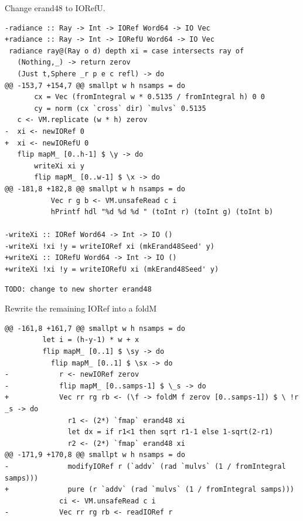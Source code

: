 \documentclass[8pt]{beamer}
\begin{document}
\begin{frame}[fragile]{Change erand48 to IORefU.}

\begin{verbatim}
-radiance :: Ray -> Int -> IORef Word64 -> IO Vec
+radiance :: Ray -> Int -> IORefU Word64 -> IO Vec
 radiance ray@(Ray o d) depth xi = case intersects ray of
   (Nothing,_) -> return zerov
   (Just t,Sphere _r p e c refl) -> do
@@ -153,7 +154,7 @@ smallpt w h nsamps = do
       cx = Vec (fromIntegral w * 0.5135 / fromIntegral h) 0 0
       cy = norm (cx `cross` dir) `mulvs` 0.5135
   c <- VM.replicate (w * h) zerov
-  xi <- newIORef 0
+  xi <- newIORefU 0
   flip mapM_ [0..h-1] $ \y -> do
       writeXi xi y
       flip mapM_ [0..w-1] $ \x -> do
@@ -181,8 +182,8 @@ smallpt w h nsamps = do
           Vec r g b <- VM.unsafeRead c i
           hPrintf hdl "%d %d %d " (toInt r) (toInt g) (toInt b)
 
-writeXi :: IORef Word64 -> Int -> IO ()
-writeXi !xi !y = writeIORef xi (mkErand48Seed' y)
+writeXi :: IORefU Word64 -> Int -> IO ()
+writeXi !xi !y = writeIORefU xi (mkErand48Seed' y)
\end{verbatim}
\begin{verbatim}
TODO: change to new shorter erand48
\end{verbatim}
\end{frame}


\begin{frame}[fragile]{Rewrite the remaining IORef into a foldM}
\begin{verbatim}
@@ -161,8 +161,7 @@ smallpt w h nsamps = do
         let i = (h-y-1) * w + x
         flip mapM_ [0..1] $ \sy -> do
           flip mapM_ [0..1] $ \sx -> do
-            r <- newIORef zerov
-            flip mapM_ [0..samps-1] $ \_s -> do
+            Vec rr rg rb <- (\f -> foldM f zerov [0..samps-1]) $ \ !r _s -> do
               r1 <- (2*) `fmap` erand48 xi
               let dx = if r1<1 then sqrt r1-1 else 1-sqrt(2-r1)
               r2 <- (2*) `fmap` erand48 xi
@@ -171,9 +170,8 @@ smallpt w h nsamps = do
-              modifyIORef r (`addv` (rad `mulvs` (1 / fromIntegral samps)))
+              pure (r `addv` (rad `mulvs` (1 / fromIntegral samps)))
             ci <- VM.unsafeRead c i
-            Vec rr rg rb <- readIORef r
\end{verbatim}
\end{frame}
\end{document}
